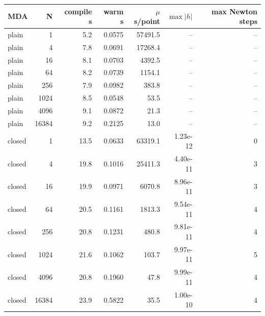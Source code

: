 \begin{tabular}{lrrrrrr}
\toprule
MDA & N & compile s & warm s & $\mu$s/point & $\max|h|$ & max Newton steps \\
\midrule
plain & 1 & 5.2 & 0.0575 & 57491.5 & -- & -- \\
plain & 4 & 7.8 & 0.0691 & 17268.4 & -- & -- \\
plain & 16 & 8.1 & 0.0703 & 4392.5 & -- & -- \\
plain & 64 & 8.2 & 0.0739 & 1154.1 & -- & -- \\
plain & 256 & 7.9 & 0.0982 & 383.8 & -- & -- \\
plain & 1024 & 8.5 & 0.0548 & 53.5 & -- & -- \\
plain & 4096 & 9.1 & 0.0872 & 21.3 & -- & -- \\
plain & 16384 & 9.2 & 0.2125 & 13.0 & -- & -- \\
closed & 1 & 13.5 & 0.0633 & 63319.1 & 1.23e-12 & 0 \\
closed & 4 & 19.8 & 0.1016 & 25411.3 & 4.40e-11 & 3 \\
closed & 16 & 19.9 & 0.0971 & 6070.8 & 8.96e-11 & 3 \\
closed & 64 & 20.5 & 0.1161 & 1813.3 & 9.54e-11 & 4 \\
closed & 256 & 20.8 & 0.1231 & 480.8 & 9.81e-11 & 4 \\
closed & 1024 & 21.6 & 0.1062 & 103.7 & 9.97e-11 & 5 \\
closed & 4096 & 20.8 & 0.1960 & 47.8 & 9.99e-11 & 4 \\
closed & 16384 & 23.9 & 0.5822 & 35.5 & 1.00e-10 & 4 \\
\bottomrule
\end{tabular}
